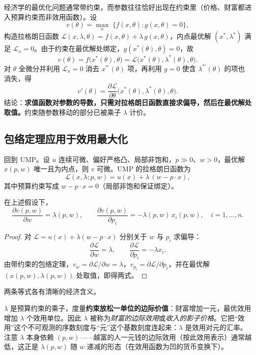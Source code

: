 \begin{remark}[带约束的形式]
经济学的最优化问题通常带约束，而参数往往恰好出现在约束里（价格、财富都进入预算约束而非效用函数）。设
\[
 v(\theta)=\max_{x}\;\{f(x,\theta):g(x,\theta)=0\},
\]
构造拉格朗日函数 $\mathcal L(x,\lambda,\theta)=f(x,\theta)+\lambda\,g(x,\theta)$，内点最优解 $(x^*,\lambda^*)$ 满足 $\mathcal L_x=0$。由于约束在最优解处绑定，$g(x^*(\theta),\theta)=0$，故
\[
 v(\theta)=f\bigl(x^*(\theta),\theta\bigr)=\mathcal L\bigl(x^*(\theta),\lambda^*(\theta),\theta\bigr).
\]
对 $\theta$ 全微分并利用 $\mathcal L_x=0$ 消去 $x^{*\prime}(\theta)$ 项，再利用 $g=0$ 使含 $\lambda^{*\prime}(\theta)$ 的项也消失，得
\[
 v'(\theta)=\frac{\partial \mathcal L}{\partial\theta}\bigl(x^*(\theta),\lambda^*(\theta),\theta\bigr).
\]
结论：\textbf{求值函数对参数的导数，只需对拉格朗日函数直接求偏导，然后在最优解处取值。}约束随参数移动的部分已被乘子 $\lambda$ 计价。
\end{remark}

\subsection{包络定理应用于效用最大化}

回到 UMP。设 $u$ 连续可微、偏好严格凸、局部非饱和，$p\gg0$、$w>0$，最优解 $x(p,w)$ 唯一且为内点，则 $v$ 可微。UMP 的拉格朗日函数为
\[
 \mathcal L(x,\lambda;p,w)=u(x)+\lambda\,(w-p\cdot x),
\]
其中预算约束写成 $w-p\cdot x=0$（局部非饱和保证绑定）。

\begin{proposition}[间接效用的包络性质]\label{prop:env-ump}
在上述假设下，
\[
 \frac{\partial v(p,w)}{\partial w}=\lambda(p,w),\qquad
 \frac{\partial v(p,w)}{\partial p_i}=-\lambda(p,w)\,x_i(p,w),\quad i=1,\ldots,n.
\]
\end{proposition}

\begin{proof}
对 $\mathcal L=u(x)+\lambda(w-p\cdot x)$ 分别关于 $w$ 与 $p_i$ 求偏导：
\[
 \frac{\partial\mathcal L}{\partial w}=\lambda,\qquad
 \frac{\partial\mathcal L}{\partial p_i}=-\lambda x_i.
\]
由带约束的包络定理，$v_w=\partial\mathcal L/\partial w=\lambda$，$v_{p_i}=\partial\mathcal L/\partial p_i$，并在最优解 $(x(p,w),\lambda(p,w))$ 处取值，即得两式。
\end{proof}

两条等式各有清晰的经济含义。

\begin{remark}[财富的影子价值：$\partial v/\partial w=\lambda$]
$\lambda$ 是预算约束的乘子，度量\textbf{约束放松一单位的边际价值}：财富增加一元，最优效用增加 $\lambda$ 个效用单位。因此 $\lambda$ 被称为\emph{财富的边际效用}或\emph{收入的影子价格}。它把“效用”这个不可观测的序数刻度与“元”这个基数刻度连起来：$\lambda$ 是效用对元的汇率。注意 $\lambda$ 本身依赖 $(p,w)$——越富的人一元钱的边际效用（按此效用表示）通常越低，这正是 $\lambda(p,w)$ 随 $w$ 递减的形态（在效用函数为凹的货币变换下）。
\end{remark}

